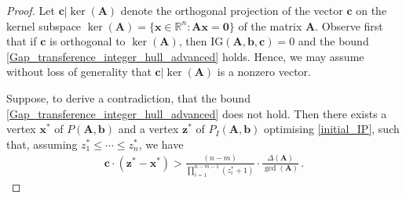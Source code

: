 \documentclass[runningheads]{llncs}
\newcommand{\ve}{\boldsymbol}
\newcommand{\be}{\begin{eqnarray}}
\newcommand{\bea}{\begin{eqnarray*}}
\newcommand{\ee}{\end{eqnarray}}
\newcommand{\eea}{\end{eqnarray*}}
\newcommand{\R}{\mathbb R}
\newcommand{\Z}{\mathbb Z}
\newcommand{\KP}{{P}}
\newcommand{\PKP}{{Q}}
\renewcommand\>{\rangle}
\newcommand\<{\langle}
\newcommand\0{\mathbf{0}}
\newcommand\bb{\ve b}%
\newcommand\cc{\ve c}%
\renewcommand\AA{\ve A}%
\newcommand\IG{\mathrm{IG}}%
\begin{document}
\begin{proof}


Let  ${\ve c}|{\ker(\AA)}$  denote the orthogonal projection of the vector $\cc$ on the kernel subspace $\ker(\AA)=\{{\ve x}\in\R^n: \AA{\ve x}={\ve 0}\}$ of the matrix $\AA$. Observe first that if ${\ve c}$ is orthogonal to $\ker(\AA)$, then $\IG(\AA,\bb,\cc)=0$ and the bound \eqref{Gap_transference_integer_hull_advanced} holds. Hence, we may assume without loss of generality that ${\ve c}|{\ker(\AA)}$ is a nonzero vector.


Suppose, to derive a contradiction, that the bound \eqref{Gap_transference_integer_hull_advanced} does not hold. Then there exists a vertex ${\ve x}^*$ of $\KP(\AA,\bb)$ and
a vertex ${\ve z}^*$ of $P_I(\AA, {\ve b})$ optimising \eqref{initial_IP}, such that, assuming $z_1^*\le\cdots\le z_n^*$, we have
\be\label{opposite_bound_integer_hull} 
{\ve c}\cdot({\ve z}^*-{\ve x}^*)> \frac{(n-m)}{\prod_{i=1}^{n-m-1}(z_i^*+1)}\cdot\frac{\Delta(\AA)}{\gcd(\AA)}\,.
\ee



\end{proof}
\end{document}
